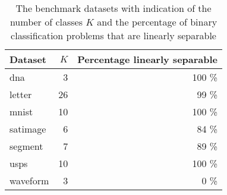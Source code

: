 \begin{table}[ht]
\centering
\begin{tabular}{lrr}
  \hline
Dataset & $K$ & Percentage linearly separable \\ 
  \hline
dna &    3 & 100 \%    \\ 
  letter &   26 & 99 \%    \\ 
  mnist &   10 & 100 \%    \\ 
  satimage &    6 & 84 \%    \\ 
  segment &    7 & 89 \%    \\ 
  usps &   10 & 100 \%    \\ 
  waveform &    3 & 0 \%    \\ 
   \hline
\end{tabular}
\caption{The benchmark datasets with indication of the number of classes $K$ and the percentage of binary classification problems that are linearly separable} 
\label{tab:sep}
\end{table}
